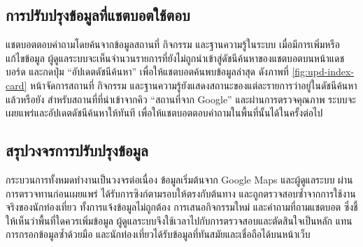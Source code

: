 
\subsection{การปรับปรุงข้อมูลที่แชตบอตใช้ตอบ}

แชตบอตตอบคำถามโดยค้นจากข้อมูลสถานที่ กิจกรรม และฐานความรู้ในระบบ เมื่อมีการเพิ่มหรือแก้ไขข้อมูล ผู้ดูแลระบบจะเห็นจำนวนรายการที่ยังไม่ถูกนำเข้าสู่ดัชนีค้นหาของแชตบอตบนหน้าแดชบอร์ด และกดปุ่ม ``อัปเดตดัชนีค้นหา'' เพื่อให้แชตบอตค้นพบข้อมูลล่าสุด ดังภาพที่ \ref{fig:upd-index-card} หน้าจัดการสถานที่ กิจกรรม และฐานความรู้ยังแสดงสถานะของแต่ละรายการว่าอยู่ในดัชนีค้นหาแล้วหรือยัง สำหรับสถานที่ที่นำเข้าจากคิว ``สถานที่จาก Google'' และผ่านการตรวจคุณภาพ ระบบจะเผยแพร่และอัปเดตดัชนีค้นหาให้ทันที เพื่อให้แชตบอตตอบคำถามในพื้นที่นั้นได้ในครั้งต่อไป


\subsection{สรุปวงจรการปรับปรุงข้อมูล}

กระบวนการทั้งหมดทำงานเป็นวงจรต่อเนื่อง ข้อมูลเริ่มต้นจาก Google Maps และผู้ดูแลระบบ ผ่านการตรวจทานก่อนเผยแพร่ ได้รับการซิงก์ตามรอบให้ตรงกับต้นทาง และถูกตรวจสอบซ้ำจากการใช้งานจริงของนักท่องเที่ยว ทั้งการแจ้งข้อมูลไม่ถูกต้อง การเสนอกิจกรรมใหม่ และคำถามที่ถามแชตบอต ซึ่งชี้ให้เห็นว่าพื้นที่ใดควรเพิ่มข้อมูล ผู้ดูแลระบบจึงใช้เวลาไปกับการตรวจสอบและตัดสินใจเป็นหลัก แทนการกรอกข้อมูลซ้ำด้วยมือ และนักท่องเที่ยวได้รับข้อมูลที่ทันสมัยและเชื่อถือได้บนหน้าเว็บ
